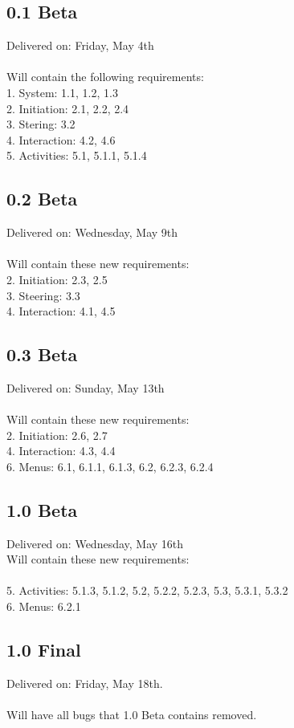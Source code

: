 \documentclass[a4paper,titlepage]{article}
\begin{document}
\subsection*{0.1 Beta}
Delivered on: Friday, May 4th\\\\ %
Will contain the following requirements:\\
1. System: 1.1, 1.2, 1.3\\
2. Initiation: 2.1, 2.2, 2.4\\
3. Stering: 3.2\\
4. Interaction: 4.2, 4.6\\
5. Activities: 5.1, 5.1.1, 5.1.4

\subsection*{0.2 Beta}
Delivered on: Wednesday, May 9th\\\\ %
Will contain these new requirements:\\
2. Initiation: 2.3, 2.5\\
3. Steering: 3.3\\
4. Interaction: 4.1, 4.5

\subsection*{0.3 Beta}
Delivered on: Sunday, May 13th\\\\ %
Will contain these new requirements:\\
2. Initiation: 2.6, 2.7\\
4. Interaction: 4.3, 4.4\\
6. Menus: 6.1, 6.1.1, 6.1.3, 6.2, 6.2.3, 6.2.4

\subsection*{1.0 Beta}
Delivered on: Wednesday, May 16th\\ %
Will contain these new requirements:\\\\
5. Activities: 5.1.3, 5.1.2, 5.2, 5.2.2, 5.2.3, 5.3, 5.3.1, 5.3.2\\
6. Menus: 6.2.1

\subsection*{1.0 Final}
Delivered on: Friday, May 18th.\\\\ %
Will have all bugs that 1.0 Beta contains removed.
\end{document}
